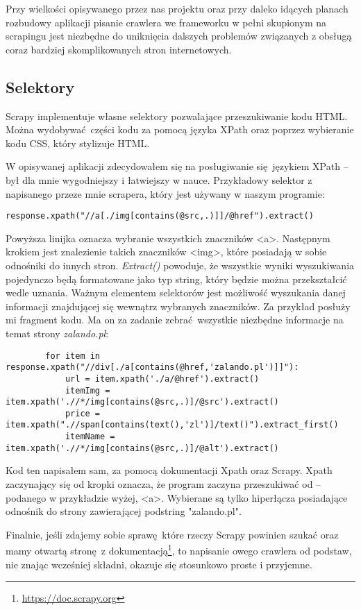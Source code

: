 Przy wielkości opisywanego przez nas projektu oraz przy daleko idących planach rozbudowy aplikacji pisanie crawlera we frameworku w pełni skupionym na scrapingu jest niezbędne do uniknięcia dalszych problemów związanych z obsługą coraz bardziej skomplikowanych stron internetowych.
\subsection{Selektory}

Scrapy implementuje własne selektory pozwalające przeszukiwanie kodu HTML.
Można wydobywać części kodu za pomocą języka XPath oraz poprzez wybieranie kodu CSS, który stylizuje HTML.

W opisywanej aplikacji zdecydowałem się na posługiwanie się językiem XPath -- był dla mnie wygodniejszy i łatwiejszy w nauce.
Przykładowy selektor z napisanego przeze mnie scrapera, który jest używany w naszym programie:
\begin{lstlisting}
response.xpath("//a[./img[contains(@src,.)]]/@href").extract()
\end{lstlisting}
Powyższa linijka oznacza wybranie wszystkich znaczników \textless a\textgreater. Następnym krokiem jest znalezienie takich znaczników \textless img\textgreater, które posiadają w sobie odnośniki do innych stron. 
\emph{Extract()} powoduje, że wszystkie wyniki wyszukiwania pojedynczo będą formatowane jako typ string, który będzie można przekształcić wedle uznania.
Ważnym elementem selektorów jest możliwość wyszukania danej informacji znajdującej się wewnątrz wybranych znaczników.
Za przykład posłuży mi fragment kodu. Ma on za zadanie zebrać wszystkie niezbędne informacje na temat strony \emph{zalando.pl}:
\begin{lstlisting}
        for item in response.xpath("//div[./a[contains(@href,'zalando.pl')]]"):
            url = item.xpath('./a/@href').extract()
            itemImg = item.xpath('.//*/img[contains(@src,.)]/@src').extract()
            price = item.xpath(".//span[contains(text(),'zl')]/text()").extract_first()
            itemName = item.xpath('.//*/img[contains(@src,.)]/@alt').extract()
\end{lstlisting}

Kod ten napisałem sam, za pomocą dokumentacji Xpath oraz Scrapy. Xpath zaczynający się od kropki oznacza, że program zaczyna przeszukiwać od -- podanego w przykładzie wyżej, \textless a\textgreater. Wybierane są tylko hiperłącza posiadające odnośnik do strony zawierającej podstring "zalando.pl".

Finalnie, jeśli zdajemy sobie sprawę które rzeczy Scrapy powinien szukać oraz mamy otwartą stronę z dokumentacją\footnote{\url{https://doc.scrapy.org}}, to napisanie owego crawlera od podstaw, nie znając wcześniej składni, okazuje się stosunkowo proste i przyjemne.
